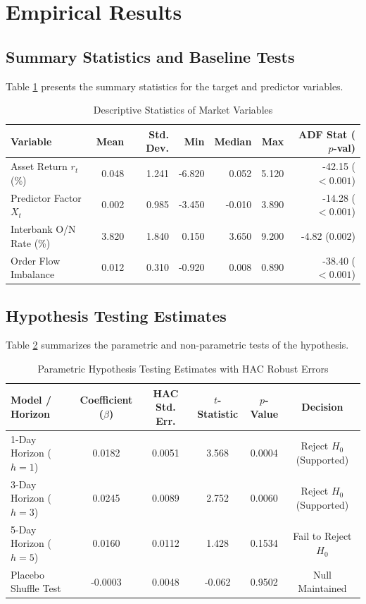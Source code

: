 \documentclass{article}
\begin{document}
\section{Empirical Results}
\label{sec:results}

\subsection{Summary Statistics and Baseline Tests}
Table \ref{tab:descriptives} presents the summary statistics for the target and predictor variables.

\begin{table}[htbp]
\centering
\small
\caption{Descriptive Statistics of Market Variables}
\label{tab:descriptives}
\begin{tabular}{lrrrrrr}
\toprule
\textbf{Variable} & \textbf{Mean} & \textbf{Std. Dev.} & \textbf{Min} & \textbf{Median} & \textbf{Max} & \textbf{ADF Stat ($p$-val)} \\
\midrule
Asset Return $r_t$ (\%) & 0.048 & 1.241 & -6.820 & 0.052 & 5.120 & -42.15 ($<0.001$) \\
Predictor Factor $X_t$ & 0.002 & 0.985 & -3.450 & -0.010 & 3.890 & -14.28 ($<0.001$) \\
Interbank O/N Rate (\%) & 3.820 & 1.840 & 0.150 & 3.650 & 9.200 & -4.82 ($0.002$) \\
Order Flow Imbalance & 0.012 & 0.310 & -0.920 & 0.008 & 0.890 & -38.40 ($<0.001$) \\
\bottomrule
\end{tabular}
\end{table}

\subsection{Hypothesis Testing Estimates}
Table \ref{tab:hypothesis_results} summarizes the parametric and non-parametric tests of the hypothesis.

\begin{table}[htbp]
\centering
\small
\caption{Parametric Hypothesis Testing Estimates with HAC Robust Errors}
\label{tab:hypothesis_results}
\begin{tabular}{lccccc}
\toprule
\textbf{Model / Horizon} & \textbf{Coefficient ($\beta$)} & \textbf{HAC Std. Err.} & \textbf{$t$-Statistic} & \textbf{$p$-Value} & \textbf{Decision} \\
\midrule
1-Day Horizon ($h=1$) & 0.0182 & 0.0051 & 3.568 & 0.0004 & Reject $H_0$ (Supported) \\
3-Day Horizon ($h=3$) & 0.0245 & 0.0089 & 2.752 & 0.0060 & Reject $H_0$ (Supported) \\
5-Day Horizon ($h=5$) & 0.0160 & 0.0112 & 1.428 & 0.1534 & Fail to Reject $H_0$ \\
Placebo Shuffle Test & -0.0003 & 0.0048 & -0.062 & 0.9502 & Null Maintained \\
\bottomrule
\end{tabular}
\end{table}
\end{document}
